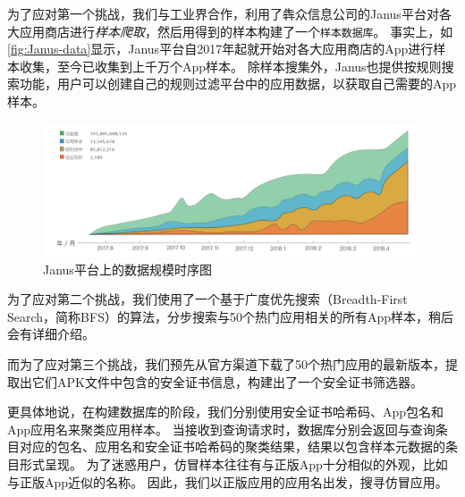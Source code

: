 为了应对第一个挑战，我们与工业界合作，利用了犇众信息公司的Janus平台对各大应用商店进行\emph{样本爬取}，然后用得到的样本构建了一个\texttt{\small 样本数据库}。
事实上，如\autoref{fig:Janus-data}显示，Janus平台自2017年起就开始对各大应用商店的App进行样本收集，至今已收集到上千万个App样本。
除样本搜集外，Janus也提供按规则搜索功能，用户可以创建自己的规则过滤平台中的应用数据，以获取自己需要的App样本。

\begin{figure}[htbp]
	\centering
	\includegraphics[width=\textwidth]{./Figures/edwin-Janus-data.png}
	\caption{Janus平台上的数据规模时序图}
	\label{fig:Janus-data}
	\vspace{-5mm}
\end{figure}

为了应对第二个挑战，我们使用了一个基于广度优先搜索（Breadth-First Search，简称BFS）的算法，分步搜索与50个热门应用相关的所有App样本，稍后会有详细介绍。

而为了应对第三个挑战，我们预先从官方渠道下载了50个热门应用的最新版本，提取出它们APK文件中包含的安全证书信息，构建出了一个安全证书筛选器。

更具体地说，在构建数据库的阶段，我们分别使用安全证书哈希码、App包名和App应用名来聚类应用样本。
当接收到查询请求时，数据库分别会返回与查询条目对应的包名、应用名和安全证书哈希码的聚类结果，结果以包含样本元数据的条目形式呈现。
为了迷惑用户，仿冒样本往往有与正版App十分相似的外观，比如与正版App近似的名称。
因此，我们以正版应用的应用名出发，搜寻仿冒应用。

